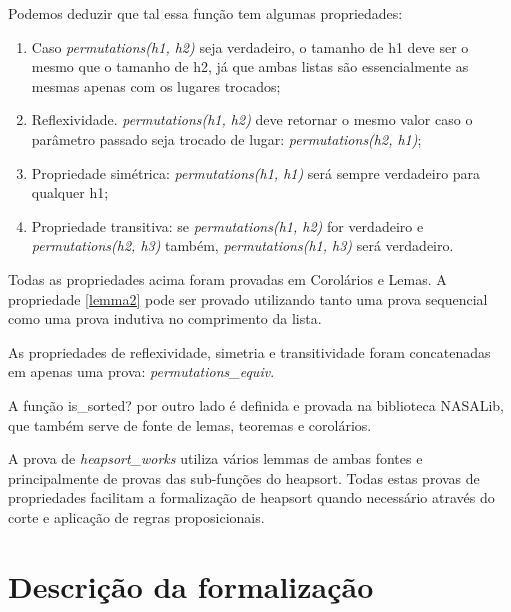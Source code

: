 Podemos deduzir que tal essa função tem algumas propriedades:

\begin{enumerate}
    \item \label{lemma2} Caso \textit{permutations(h1, h2)} seja verdadeiro, o tamanho de h1 deve ser o mesmo que o tamanho de h2, já que ambas listas são essencialmente as mesmas apenas com os lugares trocados;
    \item \label{reflex} Reflexividade. \textit{permutations(h1, h2)} deve retornar o mesmo valor caso o parâmetro passado seja trocado de lugar: \textit{permutations(h2, h1)};
    \item \label{symetry} Propriedade simétrica: \textit{permutations(h1, h1)} será sempre verdadeiro para qualquer h1;
    \item \label{trans} Propriedade transitiva: se \textit{permutations(h1, h2)} for verdadeiro e \textit{permutations(h2, h3)} também, \textit{permutations(h1, h3)} será verdadeiro.
\end{enumerate}

Todas as propriedades acima foram provadas em Corolários e Lemas. A propriedade \ref{lemma2} pode ser provado utilizando tanto uma prova sequencial como uma prova indutiva no comprimento da lista. 

As propriedades de reflexividade, simetria e transitividade foram concatenadas em apenas uma prova: \textit{permutations\_equiv}.

A função is\_sorted? por outro lado é definida e provada na biblioteca NASALib, que também serve de fonte de lemas, teoremas e corolários.

A prova de \textit{heapsort\_works} utiliza vários lemmas de ambas fontes e principalmente de provas das sub-funções do heapsort. Todas estas provas de propriedades facilitam a formalização de heapsort quando necessário através do corte e aplicação de regras proposicionais.


\section{Descrição da formalização}